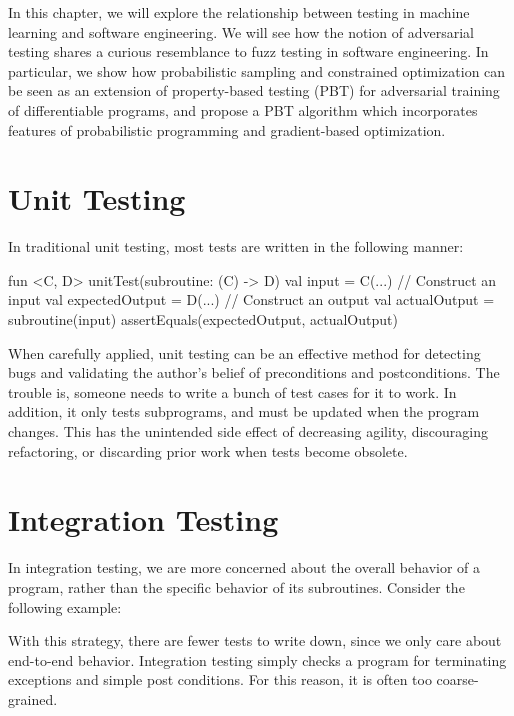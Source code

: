 \documentclass[12pt,initial,twoside,maitrise]{dms}
\numberwithin{equation}{section}
\numberwithin{table}{chapter}
\numberwithin{figure}{chapter}
\begin{document}
In this chapter, we will explore the relationship between testing in machine learning and software engineering. We will see how the notion of adversarial testing shares a curious resemblance to fuzz testing in software engineering. In particular, we show how probabilistic sampling and constrained optimization can be seen as an extension of property-based testing (PBT) for adversarial training of differentiable programs, and propose a PBT algorithm which incorporates features of probabilistic programming and gradient-based optimization.

\section{Unit Testing}

\noindent In traditional unit testing, most tests are written in the following manner:
%
\begin{kotlinlisting}
fun <C, D> unitTest(subroutine: (C) -> D) {
    val input = C(...) // Construct an input
    val expectedOutput = D(...) // Construct an output
    val actualOutput = subroutine(input)
    assertEquals(expectedOutput, actualOutput)
}
\end{kotlinlisting}
%
When carefully applied, unit testing can be an effective method for detecting bugs and validating the author's belief of preconditions and postconditions. The trouble is, someone needs to write a bunch of test cases for it to work. In addition, it only tests subprograms, and must be updated when the program changes. This has the unintended side effect of decreasing agility, discouraging refactoring, or discarding prior work when tests become obsolete.

\section{Integration Testing}

\noindent In integration testing, we are more concerned about the overall behavior of a program, rather than the specific behavior of its subroutines. Consider the following example:

%
With this strategy, there are fewer tests to write down, since we only care about end-to-end behavior. Integration testing simply checks a program for terminating exceptions and simple post conditions. For this reason, it is often too coarse-grained.
\end{document}
